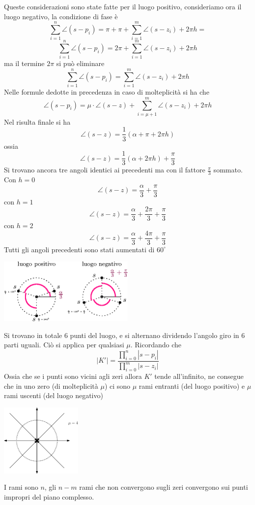 \documentclass[10pt, letterpaper]{report}
\begin{document}
Queste considerazioni sono state fatte per il luogo positivo, consideriamo ora il luogo negativo, la condizione di fase è 
$$ \sum_{i=1}^n \angle{(s-p_i)}=\pi+\pi+ \sum_{i=1}^m \angle{(s-z_i)}+2\pi h =$$
$$ \sum_{i=1}^n \angle{(s-p_i)}=2\pi+ \sum_{i=1}^m \angle{(s-z_i)}+2\pi h $$
ma il termine $2\pi$ si può eliminare 
$$ \sum_{i=1}^n \angle{(s-p_i)}= \sum_{i=1}^m \angle{(s-z_i)}+2\pi h $$
Nelle formule dedotte in precedenza in caso di molteplicità si ha che 
$$\angle{(s-p_i)}=\mu\cdot \angle (s-z)+\sum_{i=\mu+1}^m \angle(s-z_i)+2\pi h$$
Nel risulta finale si ha 
$$ \angle(s-z) =\frac{1}{3}(\alpha+\pi+2\pi h)$$
ossia 
$$ \angle(s-z) =\frac{1}{3}(\alpha+2\pi h)+\frac{\pi}{3}$$
Si trovano ancora tre angoli identici ai precedenti ma con il fattore $\frac{\pi}{3}$ sommato. Con $h=0$ 
$$ \angle(s-z) =\frac{\alpha}{3}+\frac{\pi}{3}$$
con $h=1$
$$ \angle(s-z) =\frac{\alpha}{3}+\frac{2\pi}{3}+\frac{\pi}{3}$$
con $h=2$
$$ \angle(s-z) =\frac{\alpha}{3}+\frac{4\pi}{3}+\frac{\pi}{3}$$
Tutti gli angoli precedenti sono stati aumentati di $60^\circ$
\begin{center}
    \includegraphics[width=0.5\textwidth ]{images/zeroTriplo2.eps}
\end{center}
Si trovano in totale 6 punti del luogo, e si alternano dividendo l'angolo giro in 6 parti uguali. Ciò si applica per qualsiasi $\mu$. Ricordando che 
$$ |K'|=\frac{ \displaystyle\prod_{i=0}^n|s-p_i|}{\displaystyle\prod_{i=0}^m|s-z_i|}$$
Ossia che se i punti sono vicini agli zeri allora $K'$ tende all'infinito, ne consegue che in uno zero (di molteplicità $\mu$) ci sono $\mu$ rami entranti (del luogo positivo) e $\mu$ rami uscenti (del luogo negativo)
\begin{center}
    \includegraphics[width=0.3\textwidth ]{images/mu4.eps}
\end{center}
I rami sono $n$, gli $n-m$ rami che non convergono sugli zeri convergono sui punti impropri del piano complesso.











 
\end{document}

